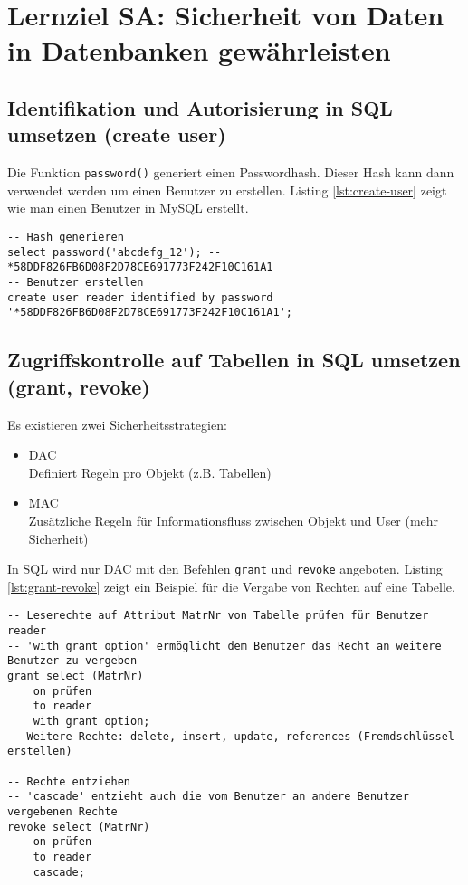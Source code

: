 \section{Lernziel SA: Sicherheit von Daten in Datenbanken gewährleisten}

\subsection{Identifikation und Autorisierung in SQL umsetzen (create user)}

Die Funktion \verb|password()| generiert einen Passwordhash. Dieser Hash kann dann verwendet werden um einen Benutzer zu erstellen. Listing \ref{lst:create-user} zeigt wie man einen Benutzer in MySQL erstellt.

\begin{lstlisting}[caption={Benutzer erstellen},label=lst:create-user]
-- Hash generieren
select password('abcdefg_12'); -- *58DDF826FB6D08F2D78CE691773F242F10C161A1
-- Benutzer erstellen
create user reader identified by password '*58DDF826FB6D08F2D78CE691773F242F10C161A1';
\end{lstlisting}

\subsection{Zugriffskontrolle auf Tabellen in SQL umsetzen (grant, revoke)}

Es existieren zwei Sicherheitsstrategien:

\begin{itemize}
	\item \ac{DAC} \\
		  Definiert Regeln pro Objekt (z.B. Tabellen)
	\item \ac{MAC} \\
		  Zusätzliche Regeln für Informationsfluss zwischen Objekt und User (mehr Sicherheit)
\end{itemize}

In SQL wird nur \ac{DAC} mit den Befehlen \verb|grant| und \verb|revoke| angeboten. Listing \ref{lst:grant-revoke} zeigt ein Beispiel für die Vergabe von Rechten auf eine Tabelle.

\begin{lstlisting}[caption={Rechte auf Tabelle},label=lst:grant-revoke]
-- Leserechte auf Attribut MatrNr von Tabelle prüfen für Benutzer reader
-- 'with grant option' ermöglicht dem Benutzer das Recht an weitere Benutzer zu vergeben
grant select (MatrNr)
	on prüfen
	to reader
	with grant option;
-- Weitere Rechte: delete, insert, update, references (Fremdschlüssel erstellen)

-- Rechte entziehen
-- 'cascade' entzieht auch die vom Benutzer an andere Benutzer vergebenen Rechte
revoke select (MatrNr)
	on prüfen
	to reader
	cascade;
\end{lstlisting}

